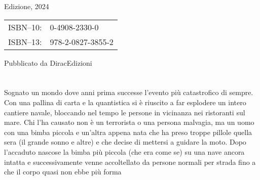 {\begin{flushleft}
\begin{justify}
{				\bigskip
				
				\textonesuperior Edizione, 2024
				
				\bigskip
				
				\begin{tabular}{rl}
					ISBN--10:& 0-4908-2330-0\\ 
					ISBN--13:& 978-2-0827-3855-2\\ 
				\end{tabular}	
				
				\bigskip
				
				Pubblicato da DiracEdizioni 
			}
		\end{justify}
	\end{flushleft}
	
	\let\cleardoublepage\clearpage

}

\chapter*{\phantom{text}}
Sognato un mondo dove anni prima successe l’evento più catastrofico di sempre. Con una pallina di carta e la quantistica si è riuscito a far esplodere un intero cantiere navale, bloccando nel tempo le persone in vicinanza nei ristoranti sul mare. Chi l’ha causato non è un terrorista o una persona malvagia, ma un uomo con una bimba piccola e un’altra appena nata che ha preso troppe pillole quella sera (il grande sonno e altre) e che decise di mettersi a guidare la moto. Dopo l’accaduto nascose la bimba più piccola (che era come se) su una nave ancora intatta e successivamente venne accoltellato da persone normali per strada fino a che il corpo quasi non ebbe più forma

\frontmatter
